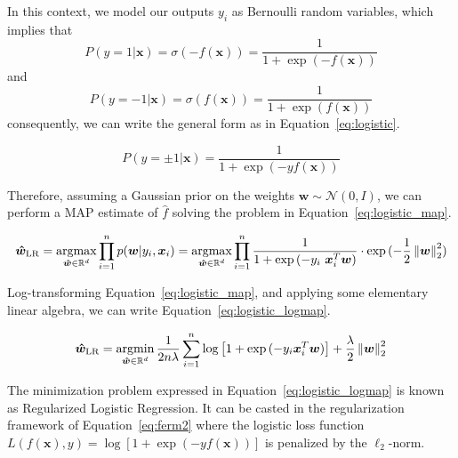 In this context, we model our outputs $y_i$ as Bernoulli random variables, which implies that
$$
P(y=1 | \bm{x}) = \sigma(-f(\bm{x})) = \frac{1}{1+\exp{(-f(\bm{x}))}}
$$
and
$$
P(y=-1 | \bm{x}) = \sigma(f(\bm{x})) = \frac{1}{1+\exp{(f(\bm{x}))}}
$$
consequently, we can write the general form as in Equation~\eqref{eq:logistic}.

\begin{equation} \label{eq:logistic}
	P(y = \pm 1 | \bm{x}) = \frac{1}{1+\exp{(-y f(\bm{x}))}}
\end{equation}

Therefore, assuming a Gaussian prior on the weights $\bm{w} \sim \mathcal{N}(0,I)$, we can perform a MAP estimate of $\hat f$ solving the problem in Equation~\eqref{eq:logistic_map}.

\begin{equation} \label{eq:logistic_map}
	\bm{\hat w}_{\text{LR}} = \mathop{\mathrm{argmax}}\limits_{\bm{\hat w} \in \mathbb{R}^d} \prod_{i=1}^n p(\bm{w}|y_i, \bm{x}_i) = \mathop{\mathrm{argmax}}\limits_{\bm{\hat w} \in \mathbb{R}^d} \prod_{i=1}^n \frac{1}{1+\exp{(-y_i~\bm{x}_i^T\bm{w})}} \cdot \exp{(-\frac{1}{2} \left\lVert\bm{w}\right\rVert_2^2)}
\end{equation}

Log-transforming Equation~\eqref{eq:logistic_map}, and applying some elementary linear algebra, we can write Equation~\eqref{eq:logistic_logmap}.

\begin{equation} \label{eq:logistic_logmap}
	\bm{\hat w}_{\text{LR}} = \mathop{\mathrm{argmin}}\limits_{\bm{\hat w} \in \mathbb{R}^d} \frac{1}{2n\lambda} \sum_{i=1}^n \log \big[ 1 + \exp{(-y_i \bm{x}_i^T \bm{w})} \big] + \frac{\lambda}{2} \left\lVert\bm{w}\right\rVert_2^2
\end{equation}

The minimization problem expressed in Equation~\eqref{eq:logistic_logmap} is known as Regularized Logistic Regression. It can be casted in the regularization framework of Equation~\eqref{eq:ferm2} where the logistic loss function $L(f(\bm{x}),y) = \log{[1+\exp{(-yf(\bm{x}))}]}$ is penalized by the $\ell_2$-norm.









